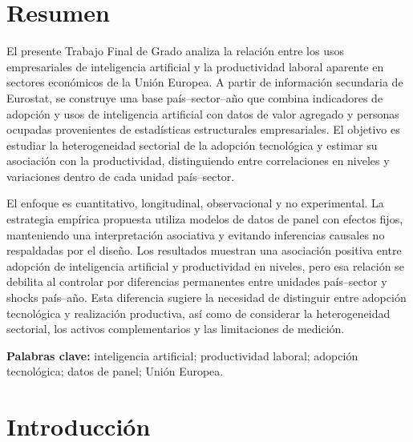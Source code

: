 \documentclass[12pt,a4paper]{article}
\begin{document}
\newpage

\tableofcontents

\newpage

\listoftables

\newpage

\listoffigures

\newpage

\section*{Resumen}


El presente Trabajo Final de Grado analiza la relación entre los usos empresariales de inteligencia artificial y la productividad laboral aparente en sectores económicos de la Unión Europea. A partir de información secundaria de Eurostat, se construye una base país--sector--año que combina indicadores de adopción y usos de inteligencia artificial con datos de valor agregado y personas ocupadas provenientes de estadísticas estructurales empresariales. El objetivo es estudiar la heterogeneidad sectorial de la adopción tecnológica y estimar su asociación con la productividad, distinguiendo entre correlaciones en niveles y variaciones dentro de cada unidad país--sector.

El enfoque es cuantitativo, longitudinal, observacional y no experimental. La estrategia empírica propuesta utiliza modelos de datos de panel con efectos fijos, manteniendo una interpretación asociativa y evitando inferencias causales no respaldadas por el diseño. Los resultados muestran una asociación positiva entre adopción de inteligencia artificial y productividad en niveles, pero esa relación se debilita al controlar por diferencias permanentes entre unidades país--sector y shocks país--año. Esta diferencia sugiere la necesidad de distinguir entre adopción tecnológica y realización productiva, así como de considerar la heterogeneidad sectorial, los activos complementarios y las limitaciones de medición.

\vspace{1.5cm}

\noindent\textbf{Palabras clave:} inteligencia artificial; productividad laboral; adopción tecnológica; datos de panel; Unión Europea.

\newpage

\section{Introducción}
\end{document}
